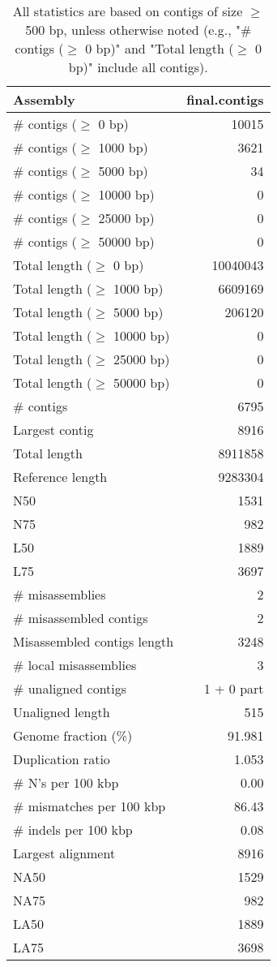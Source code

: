 \documentclass[12pt,a4paper]{article}
\begin{document}
\begin{table}[ht]
\begin{center}
\caption{All statistics are based on contigs of size $\geq$ 500 bp, unless otherwise noted (e.g., "\# contigs ($\geq$ 0 bp)" and "Total length ($\geq$ 0 bp)" include all contigs).}
\begin{tabular}{|l*{1}{|r}|}
\hline
Assembly & final.contigs \\ \hline
\# contigs ($\geq$ 0 bp) & 10015 \\ \hline
\# contigs ($\geq$ 1000 bp) & 3621 \\ \hline
\# contigs ($\geq$ 5000 bp) & 34 \\ \hline
\# contigs ($\geq$ 10000 bp) & 0 \\ \hline
\# contigs ($\geq$ 25000 bp) & 0 \\ \hline
\# contigs ($\geq$ 50000 bp) & 0 \\ \hline
Total length ($\geq$ 0 bp) & 10040043 \\ \hline
Total length ($\geq$ 1000 bp) & 6609169 \\ \hline
Total length ($\geq$ 5000 bp) & 206120 \\ \hline
Total length ($\geq$ 10000 bp) & 0 \\ \hline
Total length ($\geq$ 25000 bp) & 0 \\ \hline
Total length ($\geq$ 50000 bp) & 0 \\ \hline
\# contigs & 6795 \\ \hline
Largest contig & 8916 \\ \hline
Total length & 8911858 \\ \hline
Reference length & 9283304 \\ \hline
N50 & 1531 \\ \hline
N75 & 982 \\ \hline
L50 & 1889 \\ \hline
L75 & 3697 \\ \hline
\# misassemblies & 2 \\ \hline
\# misassembled contigs & 2 \\ \hline
Misassembled contigs length & 3248 \\ \hline
\# local misassemblies & 3 \\ \hline
\# unaligned contigs & 1 + 0 part \\ \hline
Unaligned length & 515 \\ \hline
Genome fraction (\%) & 91.981 \\ \hline
Duplication ratio & 1.053 \\ \hline
\# N's per 100 kbp & 0.00 \\ \hline
\# mismatches per 100 kbp & 86.43 \\ \hline
\# indels per 100 kbp & 0.08 \\ \hline
Largest alignment & 8916 \\ \hline
NA50 & 1529 \\ \hline
NA75 & 982 \\ \hline
LA50 & 1889 \\ \hline
LA75 & 3698 \\ \hline
\end{tabular}
\end{center}
\end{table}
\end{document}
